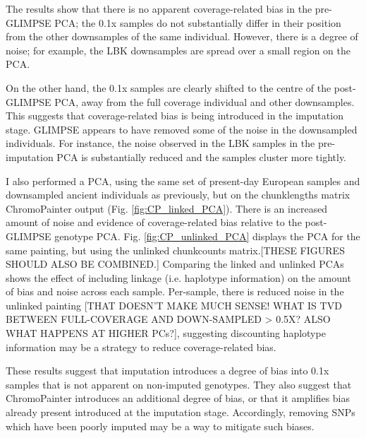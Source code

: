 The results show that there is no apparent coverage-related bias in the pre-GLIMPSE PCA; the 0.1x samples do not substantially differ in their position from the other downsamples of the same individual. However, there is a degree of noise; for example, the LBK downsamples are spread over a small region on the PCA. 

On the other hand, the 0.1x samples are clearly shifted to the centre of the post-GLIMPSE PCA, away from the full coverage individual and other downsamples. This suggests that coverage-related bias is being introduced in the imputation stage. GLIMPSE appears to have removed some of the noise in the downsampled individuals. For instance, the noise observed in the LBK samples in the pre-imputation PCA is substantially reduced and the samples cluster more tightly.  

I also performed a PCA, using the same set of present-day European samples and downsampled ancient individuals as previously, but on the chunklengths matrix ChromoPainter output (Fig. \ref{fig:CP_linked_PCA}). There is an increased amount of noise and evidence of coverage-related bias relative to the post-GLIMPSE genotype PCA. Fig. \ref{fig:CP_unlinked_PCA} displays the PCA for the same painting, but using the unlinked chunkcounts matrix.{\color{red}[THESE FIGURES SHOULD ALSO BE COMBINED.]} Comparing the linked and unlinked PCAs shows the effect of including linkage (i.e. haplotype information) on the amount of bias and noise across each sample. Per-sample, there is reduced noise in the unlinked painting {\color{red}[THAT DOESN'T MAKE MUCH SENSE! WHAT IS TVD BETWEEN FULL-COVERAGE AND DOWN-SAMPLED > 0.5X? ALSO WHAT HAPPENS AT HIGHER PCs?]}, suggesting discounting haplotype information may be a strategy to reduce coverage-related bias.

These results suggest that imputation introduces a degree of bias into 0.1x samples that is not apparent on non-imputed genotypes. They also suggest that ChromoPainter introduces an additional degree of bias, or that it amplifies bias already present introduced at the imputation stage. Accordingly, removing SNPs which have been poorly imputed may be a way to mitigate such biases.

